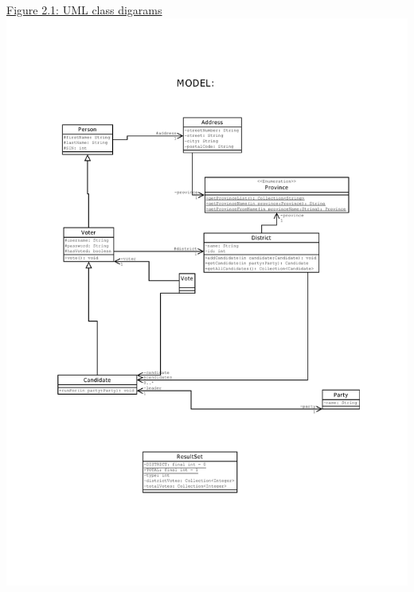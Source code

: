 \documentclass[11pt,english]{article}
\begin{document}
\underline{Figure 2.1: UML class digarams}
\vspace{5mm}\\
\includegraphics[width=6.2in]{figures/uml1.pdf} \\ 
\end{document}
